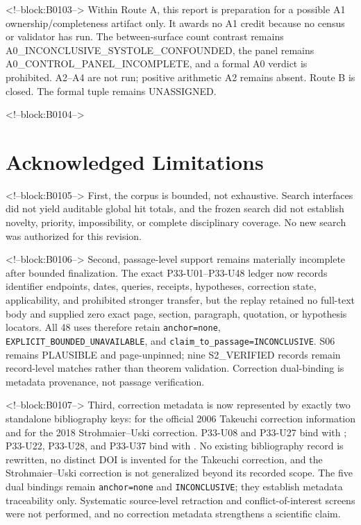 \documentclass[11pt,a4paper]{article}
\begin{document}
<!--block:B0103-->
Within Route A, this report is preparation for a possible A1 ownership/completeness artifact only. It awards no A1 credit because no census or validator has run. The between-surface count contrast remains A0\_INCONCLUSIVE\_SYSTOLE\_CONFOUNDED, the panel remains A0\_CONTROL\_PANEL\_INCOMPLETE, and a formal A0 verdict is prohibited. A2--A4 are not run; positive arithmetic A2 remains absent. Route B is closed. The formal tuple remains UNASSIGNED.

<!--block:B0104-->
\hypertarget{acknowledged-limitations}{%
\section{Acknowledged Limitations}\label{acknowledged-limitations}}

<!--block:B0105-->
First, the corpus is bounded, not exhaustive. Search interfaces did not yield auditable global hit totals, and the frozen search did not establish novelty, priority, impossibility, or complete disciplinary coverage. No new search was authorized for this revision.

<!--block:B0106-->
Second, passage-level support remains materially incomplete after bounded finalization. The exact P33-U01--P33-U48 ledger now records identifier endpoints, dates, queries, receipts, hypotheses, correction state, applicability, and prohibited stronger transfer, but the replay retained no full-text body and supplied zero exact page, section, paragraph, quotation, or hypothesis locators. All 48 uses therefore retain \texttt{anchor=none}, \texttt{EXPLICIT\_BOUNDED\_UNAVAILABLE}, and \texttt{claim\_to\_passage=INCONCLUSIVE}. S06 remains PLAUSIBLE and page-unpinned; nine S2\_VERIFIED records remain record-level matches rather than theorem validation. Correction dual-binding is metadata provenance, not passage verification.

<!--block:B0107-->
Third, correction metadata is now represented by exactly two standalone bibliography keys:  for the official 2006 Takeuchi correction information and  for the 2018 Strohmaier--Uski correction. P33-U08 and P33-U27 bind  with ; P33-U22, P33-U28, and P33-U37 bind  with . No existing bibliography record is rewritten, no distinct DOI is invented for the Takeuchi correction, and the Strohmaier--Uski correction is not generalized beyond its recorded scope. The five dual bindings remain \texttt{anchor=none} and \texttt{INCONCLUSIVE}; they establish metadata traceability only. Systematic source-level retraction and conflict-of-interest screens were not performed, and no correction metadata strengthens a scientific claim.
\end{document}
